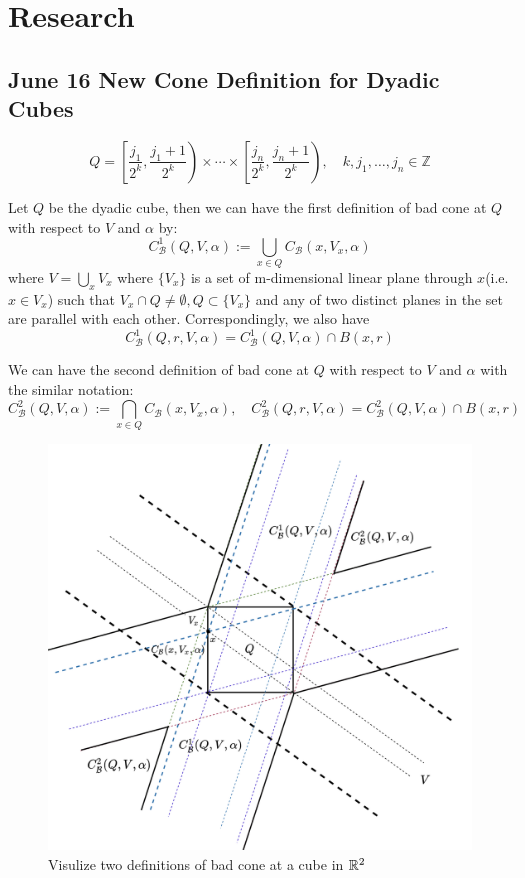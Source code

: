 \section{Research}

\subsection{June 16 New Cone Definition for Dyadic Cubes}
\begin{definition}
    $$
Q=\left[\frac{j_{1}}{2^{k}}, \frac{j_{1}+1}{2^{k}}\right) \times \cdots \times\left[\frac{j_{n}}{2^{k}}, \frac{j_{n}+1}{2^{k}}\right), \quad k, j_{1}, \ldots, j_{n} \in \mathbb{Z}
$$
\end{definition}

\begin{definition} Let $Q$ be the dyadic cube, then we can have the first definition of bad cone at $Q$ with respect to $V$ and $\alpha$ by:
    $$C^1_{\mathcal{B}}(Q, V, \alpha) := \bigcup_{x\in Q} C_\mathcal{B}(x, V_x, \alpha)$$
    where $V = \bigcup_x V_x$ where $\{V_x\}$ is a set of m-dimensional linear plane through $x$(i.e. $x\in V_x$) such that $V_x\cap Q\neq\emptyset, Q\subset \{V_x\}$ and any of two distinct planes in the set are parallel with each other. Correspondingly, we also have
    $$
    C^1_{\mathcal{B}}(Q, r, V, \alpha) = C^1_{\mathcal{B}}(Q, V, \alpha) \cap B(x,r)
    $$
\end{definition}

\begin{definition}
    We can have the second definition of bad cone at $Q$ with respect to $V$ and $\alpha$ with the similar notation:
    $$C^2_{\mathcal{B}}(Q, V, \alpha) := \bigcap_{x\in Q} C_\mathcal{B}(x, V_x, \alpha), \quad
    C^2_{\mathcal{B}}(Q, r, V, \alpha) = C^2_{\mathcal{B}}(Q, V, \alpha) \cap B(x,r)
    $$
\end{definition}
\begin{figure}[H]
    \centering
    \includegraphics[width=.66\textwidth]{images/cubebadconeDef.png}
    \caption{Visulize two definitions of bad cone at a cube in $\mathbb{R}^2$}
\end{figure}

